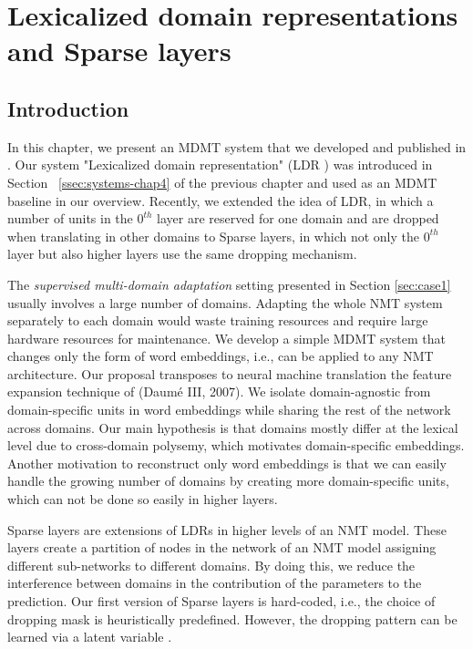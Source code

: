 \chapter{Lexicalized domain representations and Sparse layers}
\label{chap:ldr}
\section{Introduction}
In this chapter, we present an MDMT system that we developed and published in \citet{Pham19generic}. Our system "Lexicalized domain representation" (LDR ) was introduced in Section ~\ref{ssec:systems-chap4} of the previous chapter and used as an MDMT baseline in our overview. Recently, we extended the idea of LDR, in which a number of units in the $0^{th}$ layer are reserved for one domain and are dropped when translating in other domains to Sparse layers, in which not only the $0^{th}$ layer but also higher layers use the same dropping mechanism.

The \emph{supervised multi-domain adaptation} setting presented in Section \ref{sec:case1} usually involves a large number of domains. Adapting the whole NMT system separately to each domain would waste training resources and require large hardware resources for maintenance. We develop a simple MDMT system that changes only the form of word embeddings, i.e., can be applied to any NMT architecture. Our proposal transposes to neural machine translation the feature expansion technique of (Daum\'e III, 2007). We isolate domain-agnostic from domain-specific units in word embeddings while sharing the rest of the network across domains. Our main hypothesis is that domains mostly differ at the lexical level due to cross-domain polysemy, which motivates domain-specific embeddings. Another motivation to reconstruct only word embeddings is that we can easily handle the growing number of domains by creating more domain-specific units, which can not be done so easily in higher layers.

Sparse layers are extensions of LDRs in higher levels of an NMT model. These layers create a partition of nodes in the network of an NMT model assigning different sub-networks to different domains. By doing this, we reduce the interference between domains in the contribution of the parameters to the prediction. Our first version of Sparse layers is hard-coded, i.e., the choice of dropping mask is heuristically predefined. However, the dropping pattern can be learned via a latent variable \citet{Gong21pay,Gong21adaptive}.
 
